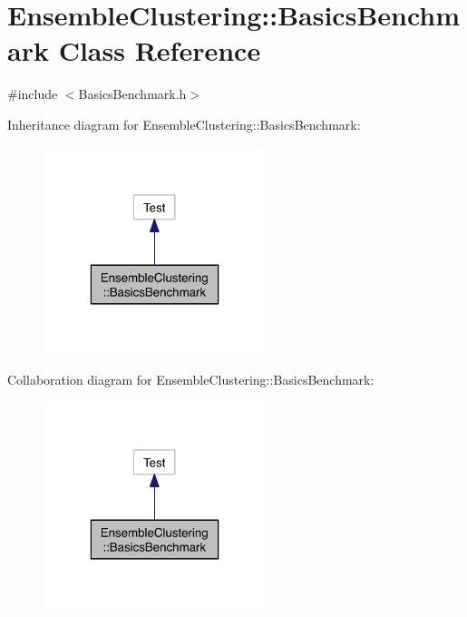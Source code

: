 \hypertarget{class_ensemble_clustering_1_1_basics_benchmark}{\section{Ensemble\-Clustering\-:\-:Basics\-Benchmark Class Reference}
\label{class_ensemble_clustering_1_1_basics_benchmark}
}


{\ttfamily \#include $<$Basics\-Benchmark.\-h$>$}



Inheritance diagram for Ensemble\-Clustering\-:\-:Basics\-Benchmark\-:
\nopagebreak
\begin{figure}[H]
\begin{center}
\leavevmode
\includegraphics[width=184pt]{class_ensemble_clustering_1_1_basics_benchmark__inherit__graph}
\end{center}
\end{figure}


Collaboration diagram for Ensemble\-Clustering\-:\-:Basics\-Benchmark\-:
\nopagebreak
\begin{figure}[H]
\begin{center}
\leavevmode
\includegraphics[width=184pt]{class_ensemble_clustering_1_1_basics_benchmark__coll__graph}
\end{center}
\end{figure}
